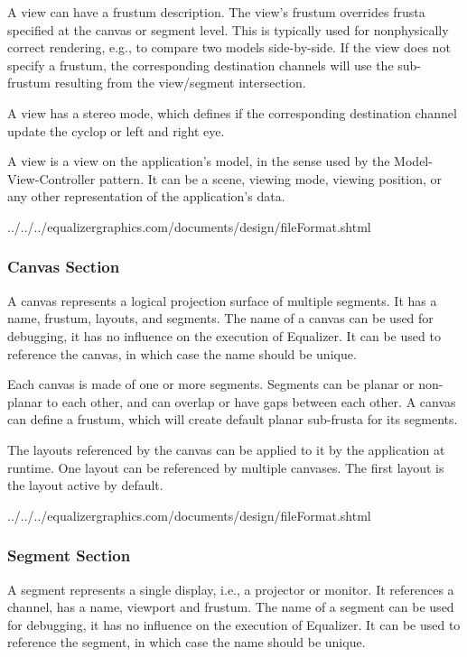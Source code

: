 \documentclass[10pt,a4]{scrartcl}
\begin{document}
A view can have a frustum description. The view's frustum overrides
frusta specified at the canvas or segment level. This is typically used
for nonphysically correct rendering, e.g., to compare two models
side-by-side. If the view does not specify a frustum, the corresponding
destination channels will use the sub-frustum resulting from the
view/segment intersection.

A view has a stereo mode, which defines if the corresponding destination channel
update the cyclop or left and right eye.

A view is a view on the application's model, in the sense used by the
Model-View-Controller pattern. It can be a scene, viewing mode, viewing
position, or any other representation of the application's data.

{\footnotesize
  {../../../equalizergraphics.com/documents/design/fileFormat.shtml}}

\subsubsection{Canvas Section}

A canvas represents a logical projection surface of multiple
segments. It has a name, frustum, layouts, and segments. The name of a
canvas can be used for debugging, it has no influence on the execution
of Equalizer. It can be used to reference the canvas, in which case the
name should be unique.

Each canvas is made of one or more segments. Segments can be planar or
non-planar to each other, and can overlap or have gaps between each
other. A canvas can define a frustum, which will create default planar
sub-frusta for its segments.

The layouts referenced by the canvas can be applied to it by the
application at runtime. One layout can be referenced by multiple
canvases. The first layout is the layout active by default.

{\footnotesize
  {../../../equalizergraphics.com/documents/design/fileFormat.shtml}}

\subsubsection{Segment Section}

A segment represents a single display, i.e., a projector or monitor. It
references a channel, has a name, viewport and frustum. The name of a
segment can be used for debugging, it has no influence on the execution
of Equalizer. It can be used to reference the segment, in which case the
name should be unique.
\end{document}
